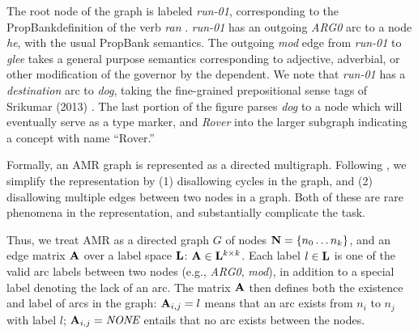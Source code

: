\documentclass[11pt]{article}
\newcommand\w[1]{\textit{#1}} %
\newcommand\e[1]{\textit{#1}} %
\newcommand\n[1]{\textit{#1}} %
\begin{document}
The root node of the graph is labeled \n{run-01}, corresponding to the PropBank\needcite definition of the verb \w{ran} .
\w{run-01} has an outgoing \e{ARG0} arc to a node \w{he}, with the usual PropBank semantics.
The outgoing \e{mod} edge from \n{run-01} to \n{glee} takes a general purpose semantics corresponding to adjective, adverbial, or other modification of the governor by the dependent.
We note that \n{run-01} has a \e{destination} arc to \n{dog}, taking the fine-grained prepositional sense tags of Srikumar (2013) \needcite.
The last portion of the figure parses \w{dog} to a node which will eventually serve as a type marker, and \w{Rover} into the larger subgraph indicating a concept with name ``Rover.''

Formally, an AMR graph is represented as a directed multigraph.
Following , we simplify the representation by (1) disallowing
  cycles in the graph, and (2) disallowing multiple edges between two nodes in a
  graph.
Both of these are rare phenomena in the representation, and substantially complicate
  the task.

Thus, we treat AMR as a directed graph $G$ of nodes $\mathbf{N} = \{n_0 \dots n_k\}$, and
  an edge matrix $\mathbf{A}$ over a label space $\mathbf{L}$: $\mathbf{A} \in \mathbf{L}^{k \times k}$.
Each label $l \in \mathbf{L}$ is one of the valid arc labels between two nodes (e.g.,
  \e{ARG0}, \e{mod}), in addition to a special label denoting the lack of an arc.
The matrix $\mathbf{A}$ then defines both the existence and label of arcs in the graph:
  $\mathbf{A}_{i,j} = l$ means that an arc exists from $n_i$ to $n_j$ with label $l$;
  $\bA_{i,j} = \e{NONE}$ entails that no arc exists between the nodes.

\end{document}
